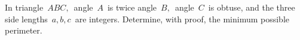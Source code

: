 In triangle $\, ABC, \,$ angle $\,A\,$ is twice angle $\,B,\,$ angle $\,C\,$ is obtuse, and the three side lengths $\,a,b,c\,$ are integers.  Determine, with proof, the minimum possible perimeter.